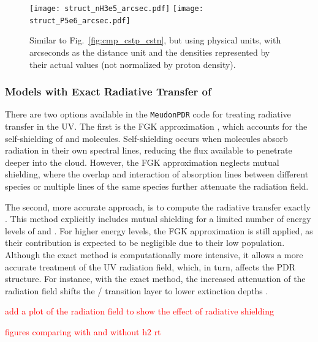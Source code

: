 \documentclass[12pt,a4paper]{article}
\newcommand{\mdpdr}{\texttt{MeudonPDR} code}
\newcommand{\qt}[1]{\textcolor{red}{#1}}
\begin{document}
\begin{figure}[hb]
    \centering
    \texttt{[image: struct\_nH3e5\_arcsec.pdf]}
    \texttt{[image: struct\_P5e6\_arcsec.pdf]}
    \caption{Similar to Fig.~\ref{fig:cmp_cstp_cstn}, but using physical units, with arcseconds as the distance unit and the densities represented by their actual values (not normalized by proton density).} \label{fig:cmp_cstp_cstn_arcsec}
\end{figure}

\subsubsection{Models with Exact Radiative Transfer of } \label{sec:exactrt}

There are two options available in the \mdpdr{} for treating radiative transfer in the UV. The first is the FGK approximation \parencite{Federman1979}, which accounts for the self-shielding of  and  molecules. Self-shielding occurs when molecules absorb radiation in their own spectral lines, reducing the flux available to penetrate deeper into the cloud. However, the FGK approximation neglects mutual shielding, where the overlap and interaction of absorption lines between different species or multiple lines of the same species further attenuate the radiation field.

The second, more accurate approach, is to compute the radiative transfer exactly \parencite{Goicoechea2007,Gonzalez2008}. This method explicitly includes mutual shielding for a limited number of energy levels of  and . For higher energy levels, the FGK approximation is still applied, as their contribution is expected to be negligible due to their low population. Although the exact method is computationally more intensive, it allows a more accurate treatment of the UV radiation field, which, in turn, affects the PDR structure. For instance, with the exact method, the increased attenuation of the radiation field shifts the / transition layer to lower extinction depths \parencite{Goicoechea2007}.

\qt{add a plot of the radiation field to show the effect of radiative shielding}

\qt{figures comparing with and without h2 rt}
\end{document}
